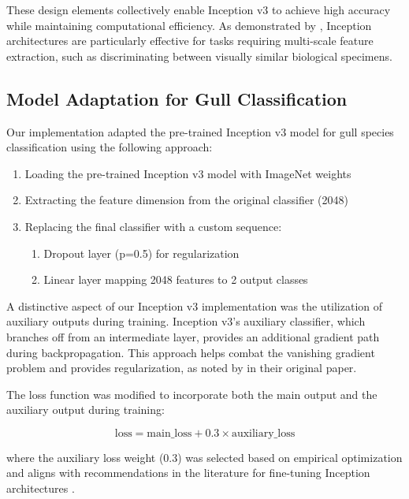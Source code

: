 \documentclass[a4paper,12pt]{article}
\begin{document}
These design elements collectively enable Inception v3 to achieve high accuracy while maintaining computational efficiency. As demonstrated by \citep{shu2023multiscale}, Inception architectures are particularly effective for tasks requiring multi-scale feature extraction, such as discriminating between visually similar biological specimens.

\subsection{Model Adaptation for Gull Classification}

Our implementation adapted the pre-trained Inception v3 model for gull species classification using the following approach:

\begin{enumerate}
    \item Loading the pre-trained Inception v3 model with ImageNet weights
    \item Extracting the feature dimension from the original classifier (2048)
    \item Replacing the final classifier with a custom sequence:
    \begin{enumerate}
        \item Dropout layer (p=0.5) for regularization
        \item Linear layer mapping 2048 features to 2 output classes
    \end{enumerate}
\end{enumerate}

A distinctive aspect of our Inception v3 implementation was the utilization of auxiliary outputs during training. Inception v3's auxiliary classifier, which branches off from an intermediate layer, provides an additional gradient path during backpropagation. This approach helps combat the vanishing gradient problem and provides regularization, as noted by \citep{szegedy2016rethinking} in their original paper.

The loss function was modified to incorporate both the main output and the auxiliary output during training:

\begin{equation}
\text{loss} = \text{main\_loss} + 0.3 \times \text{auxiliary\_loss}
\end{equation}

where the auxiliary loss weight (0.3) was selected based on empirical optimization and aligns with recommendations in the literature for fine-tuning Inception architectures \citep{touvron2021training}.
\end{document}
